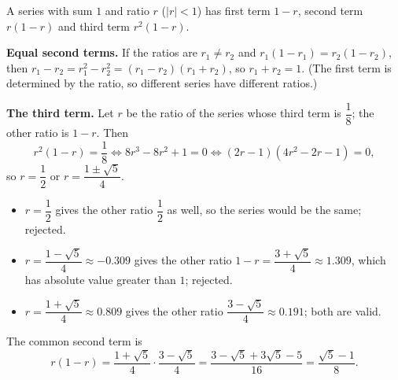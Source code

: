 A series with sum $1$ and ratio $r$ ($|r|<1$) has first term $1-r$, second term $r(1-r)$ and third term $r^2(1-r)$.

\textbf{Equal second terms.} If the ratios are $r_1\ne r_2$ and $r_1(1-r_1)=r_2(1-r_2)$, then $r_1-r_2=r_1^2-r_2^2=(r_1-r_2)(r_1+r_2)$, so $r_1+r_2=1$. (The first term is determined by the ratio, so different series have different ratios.)

\textbf{The third term.} Let $r$ be the ratio of the series whose third term is $\dfrac18$; the other ratio is $1-r$. Then
\[r^2(1-r)=\dfrac18\iff8r^3-8r^2+1=0\iff(2r-1)\left(4r^2-2r-1\right)=0,\]
so $r=\dfrac12$ or $r=\dfrac{1\pm\sqrt5}{4}$.
\begin{itemize}
\item $r=\dfrac12$ gives the other ratio $\dfrac12$ as well, so the series would be the same; rejected.
\item $r=\dfrac{1-\sqrt5}{4}\approx-0.309$ gives the other ratio $1-r=\dfrac{3+\sqrt5}{4}\approx1.309$, which has absolute value greater than $1$; rejected.
\item $r=\dfrac{1+\sqrt5}{4}\approx0.809$ gives the other ratio $\dfrac{3-\sqrt5}{4}\approx0.191$; both are valid.
\end{itemize}
The common second term is
\[r(1-r)=\dfrac{1+\sqrt5}{4}\cdot\dfrac{3-\sqrt5}{4}=\dfrac{3-\sqrt5+3\sqrt5-5}{16}=\boxed{\dfrac{\sqrt5-1}{8}}.\]
